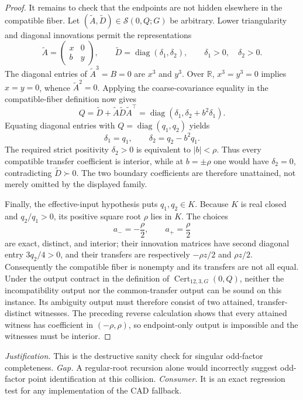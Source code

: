 \documentclass{article}
\begin{document}
\begin{proof}
It remains to check that the endpoints are not hidden elsewhere in the compatible fiber.  Let \((\widetilde A,\widetilde D)\in\mathcal S(0,Q;G)\) be arbitrary.  Lower triangularity and diagonal innovations permit the representations
\[
\widetilde A=\left(\begin{smallmatrix}x&0\\ b&y\end{smallmatrix}\right),
\qquad
\widetilde D=\operatorname{diag}(\delta_1,\delta_2),
\qquad
\delta_1>0,\quad\delta_2>0.
\]
The diagonal entries of \(\widetilde A^3=B=0\) are \(x^3\) and \(y^3\).  Over \(\mathbb R\), \(x^3=y^3=0\) implies \(x=y=0\), whence \(\widetilde A^2=0\).  Applying the coarse-covariance equality in the compatible-fiber definition now gives
\[
Q
=\widetilde D+\widetilde A\widetilde D\widetilde A^{\top}
=\operatorname{diag}(\delta_1,\delta_2+b^2\delta_1).
\]
Equating diagonal entries with \(Q=\operatorname{diag}(q_1,q_2)\) yields
\[
\delta_1=q_1,
\qquad
\delta_2=q_2-b^2q_1.
\]
The required strict positivity \(\delta_2>0\) is equivalent to \(|b|<\rho\).  Thus every compatible transfer coefficient is interior, while at \(b=\pm\rho\) one would have \(\delta_2=0\), contradicting \(\widetilde D\succ0\).  The two boundary coefficients are therefore unattained, not merely omitted by the displayed family.

Finally, the effective-input hypothesis puts \(q_1,q_2\in K\).  Because \(K\) is real closed and \(q_2/q_1>0\), its positive square root \(\rho\) lies in \(K\).  The choices
\[
a_-=-\frac{\rho}{2},
\qquad
a_+=\frac{\rho}{2}
\]
are exact, distinct, and interior; their innovation matrices have second diagonal entry \(3q_2/4>0\), and their transfers are respectively \(-\rho z/2\) and \(\rho z/2\).  Consequently the compatible fiber is nonempty and its transfers are not all equal.  Under the output contract in the definition of \(\operatorname{Cert}_{12,3,G}(0,Q)\), neither the incompatibility output nor the common-transfer output can be sound on this instance.  Its ambiguity output must therefore consist of two attained, transfer-distinct witnesses.  The preceding reverse calculation shows that every attained witness has coefficient in \((-\rho,\rho)\), so endpoint-only output is impossible and the witnesses must be interior.
\end{proof}
\par\smallskip\noindent \textit{Justification.} This is the destructive sanity check for singular odd-factor completeness. \textit{Gap.} A regular-root recursion alone would incorrectly suggest odd-factor point identification at this collision. \textit{Consumer.} It is an exact regression test for any implementation of the CAD fallback.
\end{document}

